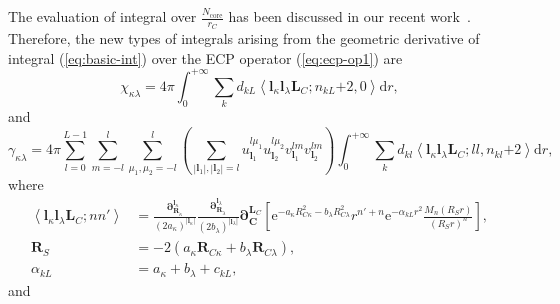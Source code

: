 \documentclass[a4paper,11pt,twoside,openright]{book}
\begin{document}
The evaluation of integral over $\frac{N_\text{core}}{r_C}$ has been discussed in our recent
work~\cite{Gao:IJQC:2010}. Therefore, the new types of integrals arising from the geometric
derivative of integral (\ref{eq:basic-int}) over the ECP operator (\ref{eq:ecp-op1}) are~\cite{McMurchie:JCP44:289,Flores-Moreno:JCC27:1009}
\begin{equation}
  \chi_{\kappa\lambda}=4\pi\int_{0}^{+\infty}\sum_{k}d_{kL}%
    \left\langle\boldsymbol{l}_{\kappa}\boldsymbol{l}_{\lambda}%
      \boldsymbol{L}_{C};n_{kL}\mathrm{+}2,0\right\rangle\mathrm{d}{r},
\end{equation}
and
\begin{equation}
  \gamma_{\kappa\lambda}=4\pi\sum_{l=0}^{L-1}\sum_{m=-l}^{l}\sum_{\mu_1,\mu_2=-l}^{l}%
    \left(\sum_{|\boldsymbol{l}_1|,|\boldsymbol{l}_2|=l}%
    u_{\boldsymbol{l}_1}^{l\mu_1}u_{\boldsymbol{l}_2}^{l\mu_2}%
    v_{\boldsymbol{l}_1}^{lm}v_{\boldsymbol{l}_2}^{lm}\right)%
    \int_{0}^{+\infty}\sum_{k}d_{kl}%
    \left\langle\boldsymbol{l}_{\kappa}\boldsymbol{l}_{\lambda}%
      \boldsymbol{L}_{C};ll,n_{kl}\mathrm{+}2\right\rangle\mathrm{d}{r},
\end{equation}
where
\begin{align}
  \left\langle\boldsymbol{l}_{\kappa}\boldsymbol{l}_{\lambda}\boldsymbol{L}_{C};nn'\right\rangle
  &=\frac{\boldsymbol{\partial}_{\boldsymbol{R}_{\kappa}}^{\boldsymbol{l}_{\kappa}}}%
      {(2a_{\kappa})^{|\boldsymbol{l}_{\kappa}|}}%
    \frac{\boldsymbol{\partial}_{\boldsymbol{R}_{\lambda}}^{\boldsymbol{l}_{\lambda}}}%
      {(2b_{\lambda})^{|\boldsymbol{l}_{\lambda}|}}%
    \boldsymbol{\partial}_{\boldsymbol{C}}^{\boldsymbol{L}_{C}}%
    \left[\mathrm{e}^{-a_{\kappa}R_{C\kappa}^{2}-b_{\lambda}R_{C\lambda}^{2}}%
    r^{n'+n}\mathrm{e}^{-\alpha_{kL}r^2}\frac{M_{n}(R_{S}r)}{(R_{S}r)^{n}}\right],\\
  \boldsymbol{R}_{S}&=-2(a_{\kappa}\boldsymbol{R}_{C\kappa}+b_{\lambda}\boldsymbol{R}_{C\lambda}),\\
  \alpha_{kL}&=a_{\kappa}+b_{\lambda}+c_{kL},
\end{align}
and
\end{document}
